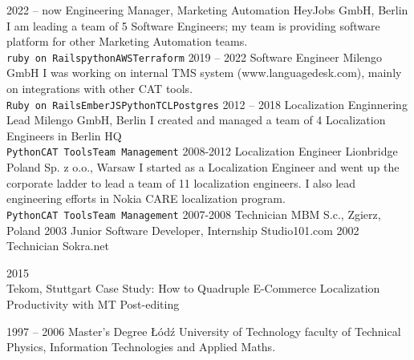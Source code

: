 \documentclass[8pt]{developercv} %
\begin{document}
\begin{entrylist}
	\entry
		{2022 -- now}
		{Engineering Manager, Marketing Automation}
		{HeyJobs GmbH, Berlin}
		{I am leading a team of 5 Software Engineers; my team is providing software platform for other Marketing Automation teams.\\ \texttt{ruby on Rails}\slashsep\texttt{python}\slashsep\texttt{AWS}\slashsep\texttt{Terraform}}
	\entry
		{2019 -- 2022}
		{Software Engineer}
		{Milengo GmbH}
		{I was working on internal TMS system (www.languagedesk.com), mainly on integrations with other CAT tools.
			\\ \texttt{Ruby on Rails}\slashsep\texttt{EmberJS}\slashsep\texttt{Python}\slashsep\texttt{TCL}\slashsep\texttt{Postgres}}
	\entry
		{2012 -- 2018}
		{Localization Enginnering Lead}
		{Milengo GmbH, Berlin}
		{I created and managed a team of 4 Localization Engineers in Berlin HQ
		\\ \texttt{Python}\slashsep\texttt{CAT Tools}\slashsep\texttt{Team Management}}
	\entry
		{2008-2012}
		{Localization Engineer}
		{Lionbridge Poland Sp. z o.o., Warsaw}
		{I started as a Localization Engineer and went up the corporate ladder to lead a team of 11 localization engineers.
		I also lead engineering efforts in Nokia CARE localization program.
		\\ \texttt{Python}\slashsep\texttt{CAT Tools}\slashsep\texttt{Team Management}}
	\entry
		{2007-2008}
		{Technician}
		{MBM S.c., Zgierz, Poland }
		{ }
	\entry
		{2003}
		{Junior Software Developer, Internship}
		{Studio101.com }
		{ }
	\entry
		{2002}
		{Technician}
		{Sokra.net }
		{ }
\end{entrylist}


\begin{entrylist}
	\entry
		{2015}
		{ \\ }
		{Tekom, Stuttgart}
		{Case Study: How to Quadruple E-Commerce Localization Productivity with 
		MT Post-editing }
\end{entrylist}





\begin{entrylist}
	\entry
		{1997 -- 2006}
		{Master's Degree}
		{Łódź University of Technology}
		{faculty of Technical Physics, Information Technologies and Applied Maths.}
\end{entrylist}
\end{document}
